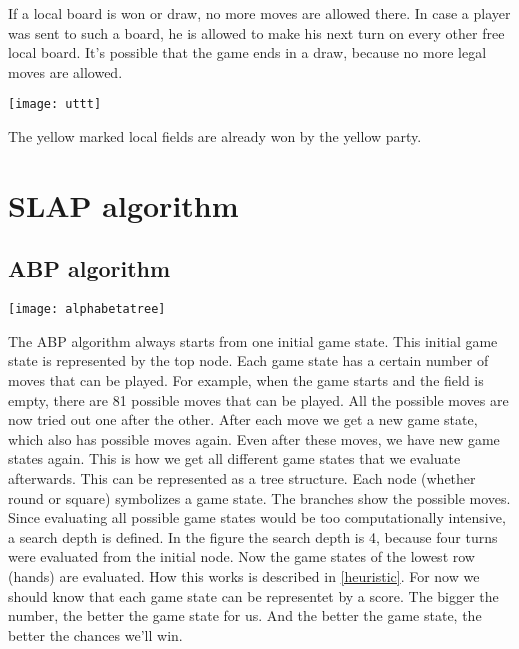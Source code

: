 If a local board is won or draw, no more moves are allowed there. In case a player was sent to such a board, he is allowed to make his next turn on every other free local board. It's possible that the game ends in a draw, because  no more legal moves are allowed.

\begin{fixedpic}
	\centering
	\texttt{[image: uttt]}
\end{fixedpic}

The yellow marked local fields are already won by the yellow party.

\section{\acs*{SLAP} algorithm}



\subsection{\acl*{ABP} algorithm} \label{abpalgo}
\begin{fixedpic}
	\centering
	\texttt{[image: alphabetatree]}
\end{fixedpic}



The \ac{ABP} algorithm always starts from one initial game state. This initial game state is represented by the top node. 
Each game state has a certain number of moves that can be played. For example, when the game starts and the field is empty, there are 81 possible moves that can be played.
All the possible moves are now tried out one after the other. After each move we get a new game state, which also has possible moves again. Even after these moves, we have new game states again. 
This is how we get all different game states that we evaluate afterwards.
This can be represented as a tree structure. Each node (whether round or square) symbolizes a game state. The branches show the possible moves. Since evaluating all possible game states would be too computationally intensive, a search depth is defined. In the figure the search depth is 4, because four turns were evaluated from the initial node. Now the game states of the lowest row (hands) are evaluated. How this works is described in \autoref{heuristic}. For now we should know that each game state can be representet by a score. The bigger the number, the better the game state for us. And the better the game state, the better the chances we'll win.\\

